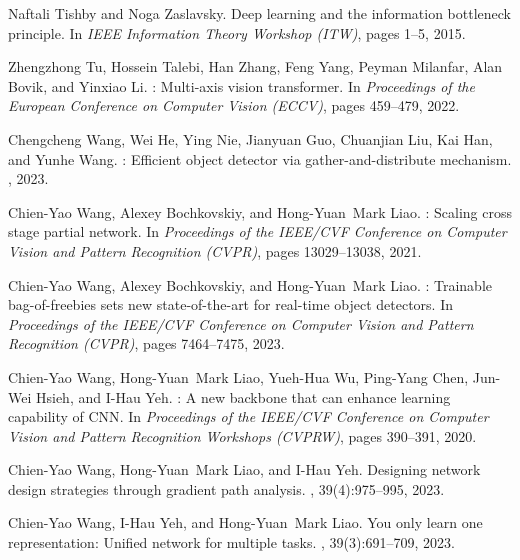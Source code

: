 \documentclass[10pt,twocolumn,letterpaper]{article}
\begin{document}
{\begin{thebibliography}{10}
		Naftali Tishby and Noga Zaslavsky.
		\newblock Deep learning and the information bottleneck principle.
		\newblock In {\em IEEE Information Theory Workshop (ITW)}, pages 1--5, 2015.
		
		Zhengzhong Tu, Hossein Talebi, Han Zhang, Feng Yang, Peyman Milanfar, Alan
		Bovik, and Yinxiao Li.
		: Multi-axis vision transformer.
		\newblock In {\em Proceedings of the European Conference on Computer Vision
			(ECCV)}, pages 459--479, 2022.
		
		Chengcheng Wang, Wei He, Ying Nie, Jianyuan Guo, Chuanjian Liu, Kai Han, and
		Yunhe Wang.
		: Efficient object detector via gather-and-distribute
		mechanism.
		,
		2023.
		
		Chien-Yao Wang, Alexey Bochkovskiy, and Hong-Yuan~Mark Liao.
		: Scaling cross stage partial network.
		\newblock In {\em Proceedings of the IEEE/CVF Conference on Computer Vision and
			Pattern Recognition (CVPR)}, pages 13029--13038, 2021.
		
		Chien-Yao Wang, Alexey Bochkovskiy, and Hong-Yuan~Mark Liao.
		: Trainable bag-of-freebies sets new state-of-the-art for
		real-time object detectors.
		\newblock In {\em Proceedings of the IEEE/CVF Conference on Computer Vision and
			Pattern Recognition (CVPR)}, pages 7464--7475, 2023.
		
		Chien-Yao Wang, Hong-Yuan~Mark Liao, Yueh-Hua Wu, Ping-Yang Chen, Jun-Wei
		Hsieh, and I-Hau Yeh.
		: A new backbone that can enhance learning capability of
		{CNN}.
		\newblock In {\em Proceedings of the IEEE/CVF Conference on Computer Vision and
			Pattern Recognition Workshops (CVPRW)}, pages 390--391, 2020.
		
		Chien-Yao Wang, Hong-Yuan~Mark Liao, and I-Hau Yeh.
		\newblock Designing network design strategies through gradient path analysis.
		,
		39(4):975--995, 2023.
		
		Chien-Yao Wang, I-Hau Yeh, and Hong-Yuan~Mark Liao.
		\newblock You only learn one representation: Unified network for multiple
		tasks.
		,
		39(3):691--709, 2023.
		

\end{thebibliography}}
\end{document}
